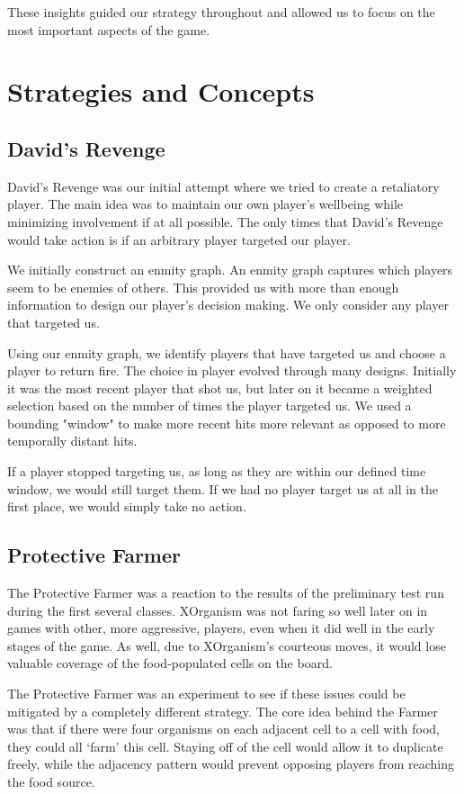 \documentclass[
10pt, %
letterpaper, %
oneside, %
headinclude,footinclude, %
english
]{article}
\begin{document}
These insights guided our strategy throughout and allowed us to focus on the most important aspects of the game.

\section{Strategies and Concepts}

\subsection{David's Revenge}

David's Revenge was our initial attempt where we tried to create a retaliatory player. The main idea was to maintain our own player's wellbeing while minimizing involvement if at all possible. The only times that David's Revenge would take action is if an arbitrary player targeted our player. 

We initially construct an enmity graph. An enmity graph captures which players seem to be enemies of others. This provided us with more than enough information to design our player's decision making. We only consider any player that targeted us.

Using our enmity graph, we identify players that have targeted us and choose a player to return fire. The choice in player evolved through many designs. Initially it was the most recent player that shot us, but later on it became a weighted selection based on the number of times the player targeted us. We used a bounding "window" to make more recent hits more relevant as opposed to more temporally distant hits. 

If a player stopped targeting us, as long as they are within our defined time window, we would still target them. If we had no player target us at all in the first place, we would simply take no action.



\subsection{Protective Farmer}
The Protective Farmer was a reaction to the results of the preliminary test run during the first several classes. XOrganism was not faring so well later on in games with other, more aggressive, players, even when it did well in the early stages of the game. As well, due to XOrganism's courteous moves, it would lose valuable coverage of the food-populated cells on the board.

The Protective Farmer was an experiment to see if these issues could be mitigated by a completely different strategy. The core idea behind the Farmer was that if there were four organisms on each adjacent cell to a cell with food, they could all `farm' this cell. Staying off of the cell would allow it to duplicate freely, while the adjacency pattern would prevent opposing players from reaching the food source.
\end{document}
